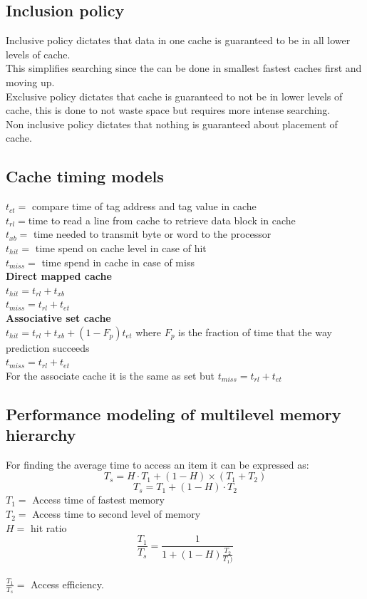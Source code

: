 \documentclass[12pt, a4paper]{article}
\begin{document}
		\subsection{Inclusion policy}
			Inclusive policy dictates that data in one cache is guaranteed to be in all lower levels of cache. \\
			This simplifies searching since the can be done in smallest fastest caches first and moving up.\\
			Exclusive policy dictates that cache is guaranteed to not be in lower levels of cache, this is done to not waste space but requires more intense searching.\\
			Non inclusive policy dictates that nothing is guaranteed about placement of cache. 
		\subsection{Cache timing models}
			$t_{ct}=$ compare time of tag address and tag value in cache\\
			$t_{rl}=$time to read a line from cache to retrieve data block in cache\\
			$t_{xb}=$ time needed to transmit byte or word to the processor\\
			$t_{hit}=$ time spend on cache level in case of hit\\
			$t_{miss}=$ time spend in cache in case of miss\\
			\textbf{Direct mapped cache}\\
			$t_{hit}=t_{rl}+t_{xb}$\\
			$t_{miss}=t_{rl}+t_{et}$\\
			\textbf{Associative set cache}\\
			$t_{hit}=t_{rl}+t_{xb}+(1-F_p)t_{et}$ where $F_p$ is the fraction of time that the way prediction succeeds\\
			$t_{miss}=t_{rl}+t_{et}$\\
			For the associate cache it is the same as set but $t_{miss}=t_{rl}+t_{et}$
		\subsection{Performance modeling of multilevel memory hierarchy}
			For finding the average time to access an item it can be expressed as:
			$$T_s=H\cdot T_1+(1-H)\times (T_1+T_2)$$
			$$T_s=T_1+(1-H)\cdot T_2$$
			$T_1=$ Access time of fastest memory\\
			$T_2=$ Access time to second level of memory\\
			$H=$ hit ratio\\
			$$\frac{T_1}{T_s}=\frac{1}{1+(1-H)\frac{T_2}{T_1)}}$$\\
			$\frac{T_1}{T_s}=$ Access efficiency.\\
			
\end{document}
